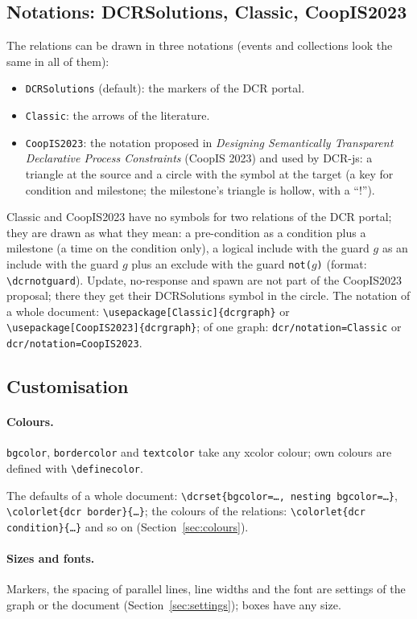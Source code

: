 \documentclass[a4paper,11pt]{article}
\newcommand\example[1]{%
  \begin{tcolorbox}[colback=white, colframe=black!25, boxrule=0.4pt,
      arc=1mm, left=2mm, right=2mm, halign lower=center]
    
    \tcblower
    
  \end{tcolorbox}}
\newcommand\cs[1]{\texttt{\textbackslash#1}}
\newcommand\key[1]{\texttt{#1}}
\begin{document}
\subsection{Notations: DCRSolutions, Classic, CoopIS2023}
The relations can be drawn in three notations (events and collections look
the same in all of them):
\begin{itemize}
  \item \texttt{DCRSolutions} (default): the markers of the DCR portal.
  \item \texttt{Classic}: the arrows of the literature.
  \item \texttt{CoopIS2023}: the notation proposed in \emph{Designing
    Semantically Transparent Declarative Process Constraints} (CoopIS 2023)
    and used by DCR-js: a triangle at the source and a circle with the symbol
    at the target (a key for condition and milestone; the milestone's
    triangle is hollow, with a ``!'').
\end{itemize}
\example{notation}
Classic and CoopIS2023 have no symbols for two relations of the DCR portal;
they are drawn as what they mean: a pre-condition as a condition plus a
milestone (a time on the condition only), a logical include with the guard
$g$ as an include with the guard $g$ plus an exclude with the guard
\texttt{not(}$g$\texttt{)} (format: \cs{dcrnotguard}). Update, no-response
and spawn are not part of the CoopIS2023 proposal; there they get their
DCRSolutions symbol in the circle. The notation of a whole document:
\cs{usepackage[Classic]\{dcrgraph\}} or \cs{usepackage[CoopIS2023]\{dcrgraph\}};
of one graph: \key{dcr/notation=Classic} or \key{dcr/notation=CoopIS2023}.

\subsection{Customisation}
\paragraph{Colours.} \key{bgcolor}, \key{bordercolor} and \key{textcolor} take
any \textsf{xcolor} colour; own colours are defined with \cs{definecolor}.
\example{colours}
The defaults of a whole document: \cs{dcrset\{bgcolor=\dots, nesting
bgcolor=\dots\}}, \cs{colorlet\{dcr border\}\{\dots\}}; the colours of the
relations: \cs{colorlet\{dcr condition\}\{\dots\}} and so on
(Section~\ref{sec:colours}).

\paragraph{Sizes and fonts.} Markers, the spacing of parallel lines, line
widths and the font are settings of the graph or the document
(Section~\ref{sec:settings}); boxes have any size.
\example{sizes}
\end{document}
